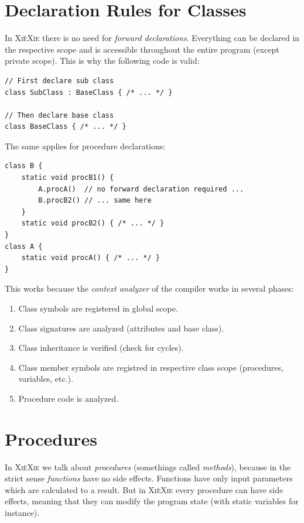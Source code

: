 \documentclass{report}
\def\xiexie{\textsc{Xi\`eXie}\xspace}
\begin{document}
\section{Declaration Rules for Classes}

In \xiexie there is no need for \textit{forward declarations}. Everything can be declared in the respective scope
and is accessible throughout the entire program (except private scope). This is why the following code is valid:
\begin{lstlisting}
// First declare sub class
class SubClass : BaseClass { /* ... */ }

// Then declare base class
class BaseClass { /* ... */ }
\end{lstlisting}
The same applies for procedure declarations:
\begin{lstlisting}
class B {
    static void procB1() {
        A.procA()  // no forward declaration required ...
        B.procB2() // ... same here
    }
    static void procB2() { /* ... */ }
}
class A {
    static void procA() { /* ... */ }
}
\end{lstlisting}
This works because the \textit{context analyzer} of the compiler works in several phases:
\begin{enumerate}
	\item Class symbols are registered in global scope.
	\item Class signatures are analyzed (attributes and base class).
	\item Class inheritance is verified (check for cycles).
	\item Class member symbols are registred in respective class scope (procedures, variables, etc.).
	\item Procedure code is analyzed.
\end{enumerate}



\section{Procedures}

In \xiexie we talk about \textit{procedures} (somethings called \textit{methods}),
because in the strict sense \textit{functions} have no side effects.
Functions have only input parameters which are calculated to a result. But in \xiexie every procedure can have side effects,
meaning that they can modify the program state (with static variables for instance).
\end{document}
